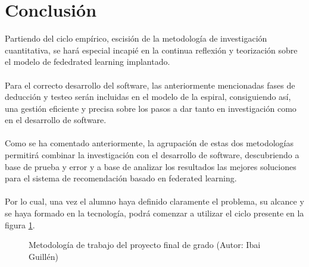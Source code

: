 \section{Conclusión}
Partiendo del ciclo empírico, escisión de la metodología de investigación cuantitativa, se hará especial incapié en la continua reflexión y teorización sobre el modelo de fededrated learning implantado. 
\\ \\
Para el correcto desarrollo del software, las anteriormente mencionadas fases de deducción y testeo serán incluidas en el modelo de la espiral, consiguiendo así, una gestión eficiente y precisa sobre los pasos a dar tanto en investigación como en el desarrollo de software.
\\ \\
Como se ha comentado anteriormente, la agrupación de estas dos metodologías permitirá combinar la investigación con el desarrollo de software, descubriendo a base de prueba y error y a base de analizar los resultados las mejores soluciones para el sistema de recomendación basado en federated learning.
\\ \\
Por lo cual, una vez el alumno haya definido claramente el problema, su alcance y se haya formado en la tecnología, podrá comenzar a utilizar el ciclo presente en la figura \ref{fig:MetodologiaCombinada}.

\begin{figure}[thbp]
    \centering
    \caption{Metodología de trabajo del proyecto final de grado (Autor: Ibai Guillén)} 
    \label{fig:MetodologiaCombinada}
\end{figure}
